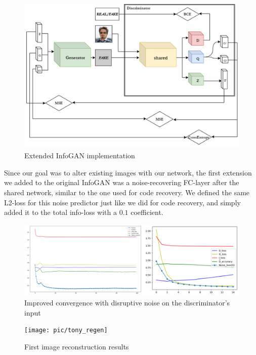 \documentclass{egpubl}
\begin{document}
\begin{figure}[!htb]
	\centering
	\includegraphics[width=\linewidth]{pic/Infogan_diss_predicting}
	\caption{Extended InfoGAN implementation}
	\label{fig:infogan_simple_noise}
\end{figure}

Since %
our goal was to alter existing images with our network, the first extension we added to the original InfoGAN was a noise-recovering FC-layer after the shared network, similar to the one used for code recovery. We defined the same L2-loss for this noise predictor just like we did for code recovery, and simply added it to the total info-loss with a $0.1$ coefficient.

\begin{figure}[!htb]
	\centering
	\includegraphics[width=\linewidth]{pic/added_noise}
	\caption{Improved convergence with disruptive noise on the discriminator's input}
	\label{fig:added_noise}
\end{figure}

\begin{figure}[!htb]
	\centering
	\texttt{[image: pic/tony\_regen]}
	\caption{First image reconstruction results}
	\label{fig:tony_regen}
\end{figure}
\end{document}
